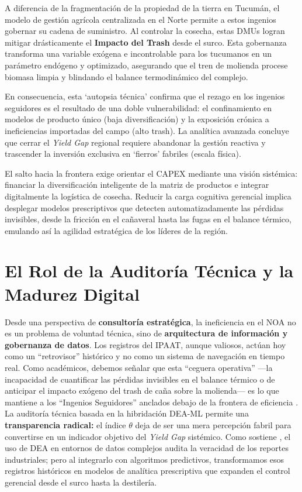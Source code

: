 \documentclass[
  spanish]{cyta}
\begin{document}
A diferencia de la fragmentación de la propiedad de la tierra en
Tucumán, el modelo de gestión agrícola centralizada en el Norte permite
a estos ingenios gobernar su cadena de suministro. Al controlar la
cosecha, estas DMUs logran mitigar drásticamente el \textbf{Impacto del
Trash} desde el surco. Esta gobernanza transforma una variable exógena e
incontrolable para los tucumanos en un parámetro endógeno y optimizado,
asegurando que el tren de molienda procese biomasa limpia y blindando el
balance termodinámico del complejo.

En consecuencia, esta `autopsia técnica' confirma que el rezago en los
ingenios seguidores es el resultado de una doble vulnerabilidad: el
confinamiento en modelos de producto único (baja diversificación) y la
exposición crónica a ineficiencias importadas del campo (alto trash). La
analítica avanzada concluye que cerrar el \emph{Yield Gap} regional
requiere abandonar la gestión reactiva y trascender la inversión
exclusiva en `fierros' fabriles (escala física).

El salto hacia la frontera exige orientar el CAPEX mediante una visión
sistémica: financiar la diversificación inteligente de la matriz de
productos e integrar digitalmente la logística de cosecha. Reducir la
carga cognitiva gerencial implica desplegar modelos prescriptivos que
detecten automatizadamente las pérdidas invisibles, desde la fricción en
el cañaveral hasta las fugas en el balance térmico, emulando así la
agilidad estratégica de los líderes de la región.

\section{El Rol de la Auditoría Técnica y la Madurez
Digital}\label{el-rol-de-la-auditoruxeda-tuxe9cnica-y-la-madurez-digital}

Desde una perspectiva de \textbf{consultoría estratégica}, la
ineficiencia en el NOA no es un problema de voluntad técnica, sino de
\textbf{arquitectura de información y gobernanza de datos}. Los
registros del IPAAT, aunque valiosos, actúan hoy como un ``retrovisor''
histórico y no como un sistema de navegación en tiempo real. Como
académicos, debemos señalar que esta ``ceguera operativa'' ---la
incapacidad de cuantificar las pérdidas invisibles en el balance térmico
o de anticipar el impacto exógeno del trash de caña sobre la molienda---
es lo que mantiene a los ``Ingenios Seguidores'' anclados debajo de la
frontera de eficiencia \citep{zhu2022}. La auditoría técnica basada en
la hibridación DEA-ML permite una \textbf{transparencia radical:} el
índice \(\theta\) deja de ser una mera percepción fabril para
convertirse en un indicador objetivo del \emph{Yield Gap} sistémico.
Como sostiene \citep{zhu2022}, el uso de DEA en entornos de datos
complejos audita la veracidad de los reportes industriales; pero al
integrarlo con algoritmos predictivos, transformamos esos registros
históricos en modelos de analítica prescriptiva que expanden el control
gerencial desde el surco hasta la destilería.
\end{document}
